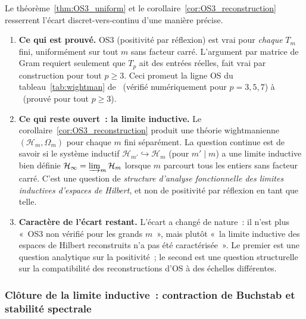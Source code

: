\documentclass[12pt,a4paper]{article}
\begin{document}
\begin{remarque}\mBR
\label{rem:OS3_honest}
Le théorème~\ref{thm:OS3_uniform} et le
corollaire~\ref{cor:OS3_reconstruction} resserrent l'écart
discret-vers-continu d'une manière précise.

\begin{enumerate}[nosep]
\item \textbf{Ce qui est prouvé.}
  OS3 (positivité par réflexion) est vrai pour \emph{chaque} $T_m$
  fini, uniformément sur tout $m$ sans facteur carré. L'argument
  par matrice de Gram requiert seulement que $T_p$ ait des entrées
  réelles, fait vrai par construction pour tout $p \geq 3$. Ceci
  promeut la ligne OS du tableau~\ref{tab:wightman} de \VALTAG\
  (vérifié numériquement pour $p = 3, 5, 7$) à \THMTAG\ (prouvé
  pour tout $p \geq 3$).

\item \textbf{Ce qui reste ouvert~: la limite inductive.}
  Le corollaire~\ref{cor:OS3_reconstruction} produit une théorie
  wightmanienne $(\mathcal{H}_m, \Omega_m)$ pour chaque $m$ fini
  séparément. La question continue est de savoir si le système
  inductif $\mathcal{H}_{m'} \hookrightarrow \mathcal{H}_m$ (pour
  $m' \mid m$) a une limite inductive bien définie
  $\mathcal{H}_\infty = \varinjlim_m \mathcal{H}_m$ lorsque $m$
  parcourt tous les entiers sans facteur carré. C'est une question
  de \emph{structure d'analyse fonctionnelle des limites inductives
  d'espaces de Hilbert}, et non de positivité par réflexion en tant
  que telle.

\item \textbf{Caractère de l'écart restant.}
  L'écart a changé de nature~: il n'est plus «~OS3 non vérifié pour
  les grands $m$~», mais plutôt «~la limite inductive des espaces
  de Hilbert reconstruits n'a pas été caractérisée~». Le premier
  est une question analytique sur la positivité~; le second est
  une question structurelle sur la compatibilité des
  reconstructions d'OS à des échelles différentes.
\end{enumerate}
\end{remarque}

\subsubsection{Clôture de la limite inductive~: contraction de Buchstab
            et stabilité spectrale}
\label{sec:ch9_inductive_limit}
\end{document}
